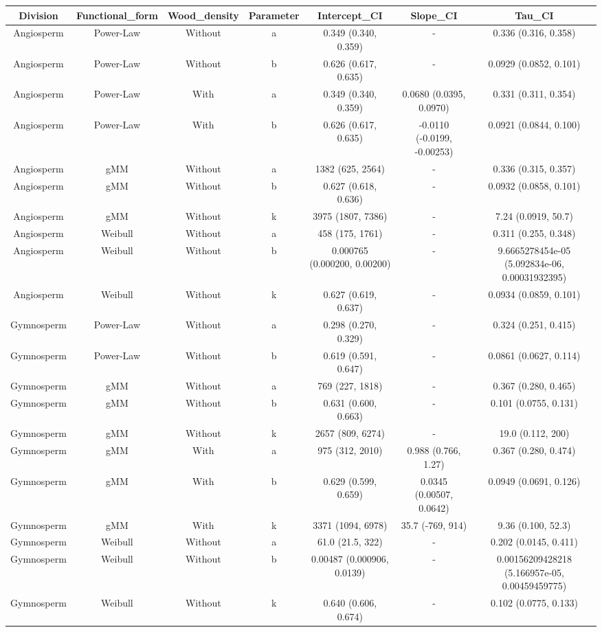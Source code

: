 \documentclass[
  12pt,
  letterpaper,
  DIV=11,
  numbers=noendperiod]{scrartcl}
\begin{document}
\begin{longtable*}[t]{ccccccc}
\toprule
Division & Functional\_form & Wood\_density & Parameter & Intercept\_CI & Slope\_CI & Tau\_CI\\
\midrule
Angiosperm & Power-Law & Without & a & 0.349 (0.340, 0.359) & - & 0.336 (0.316, 0.358)\\
Angiosperm & Power-Law & Without & b & 0.626 (0.617, 0.635) & - & 0.0929 (0.0852, 0.101)\\
Angiosperm & Power-Law & With & a & 0.349 (0.340, 0.359) & 0.0680 (0.0395, 0.0970) & 0.331 (0.311, 0.354)\\
Angiosperm & Power-Law & With & b & 0.626 (0.617, 0.635) & -0.0110 (-0.0199, -0.00253) & 0.0921 (0.0844, 0.100)\\
Angiosperm & gMM & Without & a & 1382 (625, 2564) & - & 0.336 (0.315, 0.357)\\
\addlinespace
Angiosperm & gMM & Without & b & 0.627 (0.618, 0.636) & - & 0.0932 (0.0858, 0.101)\\
Angiosperm & gMM & Without & k & 3975 (1807, 7386) & - & 7.24 (0.0919, 50.7)\\
Angiosperm & Weibull & Without & a & 458 (175, 1761) & - & 0.311 (0.255, 0.348)\\
Angiosperm & Weibull & Without & b & 0.000765 (0.000200, 0.00200) & - & 9.6665278454e-05 (5.092834e-06, 0.00031932395)\\
Angiosperm & Weibull & Without & k & 0.627 (0.619, 0.637) & - & 0.0934 (0.0859, 0.101)\\
\addlinespace
Gymnosperm & Power-Law & Without & a & 0.298 (0.270, 0.329) & - & 0.324 (0.251, 0.415)\\
Gymnosperm & Power-Law & Without & b & 0.619 (0.591, 0.647) & - & 0.0861 (0.0627, 0.114)\\
Gymnosperm & gMM & Without & a & 769 (227, 1818) & - & 0.367 (0.280, 0.465)\\
Gymnosperm & gMM & Without & b & 0.631 (0.600, 0.663) & - & 0.101 (0.0755, 0.131)\\
Gymnosperm & gMM & Without & k & 2657 (809, 6274) & - & 19.0 (0.112, 200)\\
\addlinespace
Gymnosperm & gMM & With & a & 975 (312, 2010) & 0.988 (0.766, 1.27) & 0.367 (0.280, 0.474)\\
Gymnosperm & gMM & With & b & 0.629 (0.599, 0.659) & 0.0345 (0.00507, 0.0642) & 0.0949 (0.0691, 0.126)\\
Gymnosperm & gMM & With & k & 3371 (1094, 6978) & 35.7 (-769, 914) & 9.36 (0.100, 52.3)\\
Gymnosperm & Weibull & Without & a & 61.0 (21.5, 322) & - & 0.202 (0.0145, 0.411)\\
Gymnosperm & Weibull & Without & b & 0.00487 (0.000906, 0.0139) & - & 0.00156209428218 (5.166957e-05, 0.00459459775)\\
\addlinespace
Gymnosperm & Weibull & Without & k & 0.640 (0.606, 0.674) & - & 0.102 (0.0775, 0.133)\\
\bottomrule
\end{longtable*}
\endgroup{}
\end{document}
